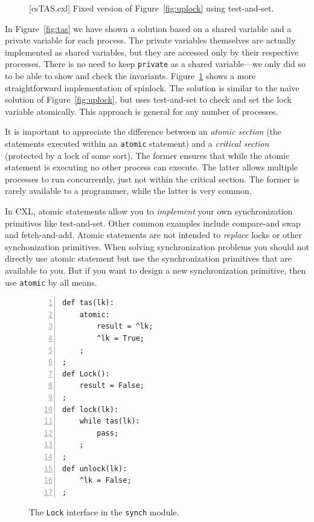 \documentclass{report}
\newenvironment{code}{
\tcolorbox
}{
\endtcolorbox
}
\begin{document}
\begin{figure}
\begin{code}
\end{code}
\caption{[csTAS.cxl] Fixed version of Figure~\ref{fig:uplock} using test-and-set.}
\label{fig:tas2}
\end{figure}

In Figure~\ref{fig:tas} we have shown a solution based on a shared
variable and a private variable for each process.   The private
variables themselves are actually implemented as shared variables,
but they are accessed only by their respective processes.
There is no need to keep \texttt{private} as a shared
variable---we only did so to be able to show and check the invariants.
Figure~\ref{fig:tas2} shows a more straightforward implementation of spinlock.
The solution is similar to the na\"{i}ve solution of Figure~\ref{fig:uplock},
but uses test-and-set to check and set the lock variable atomically.
This approach is general for any number of processes.

It is important to appreciate the difference between an
\emph{atomic section} (the statements executed within an
\texttt{atomic} statement) and a \emph{critical section}
(protected by a lock of some sort).
The former ensures that while the
atomic statement is executing no other process can execute.
The latter allows multiple processes to run concurrently,
just not within the critical section.
The former is rarely available to a programmer, while the latter
is very common.

In CXL, atomic statements allow you to \emph{implement} your own
synchronization primitives like test-and-set.  Other common examples
include compare-and swap and fetch-and-add.  Atomic statements
are not intended to \emph{replace} locks or other synchonization primitives.
When solving synchronization problems you should not directly use
atomic statement but use the synchronization primitives that are available
to you.  But if you want to design a new synchronization primitive, then
use \texttt{atomic} by all means.

\begin{figure}
\begin{code}
\begin{Verbatim}[xleftmargin=5mm,numbers=left]
def tas(lk):
    atomic:
        result = ^lk;
        ^lk = True;
    ;
;
def Lock():
    result = False;
;
def lock(lk):
    while tas(lk):
        pass;
    ;
;
def unlock(lk):
    ^lk = False;
;
\end{Verbatim}
\end{code}
\caption{The \texttt{Lock} interface in the \texttt{synch} module.}
\label{fig:spinlocks}
\end{figure}
\end{document}
